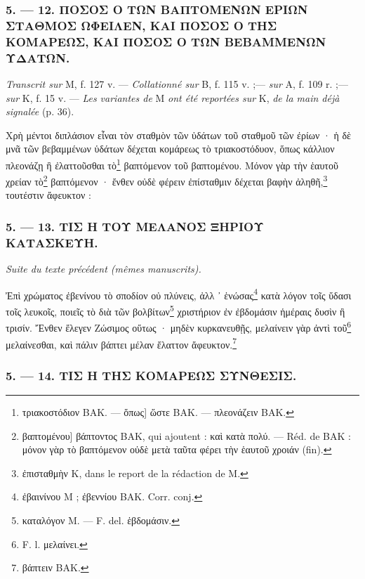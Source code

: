 \documentclass[a4paper, 11pt, oneside, polutonikogreek, french]{article}
\begin{document}
\bigskip
\centerline{\EightStarTaper}
\centerline{\EightStarTaper\EightStarTaper}
\bigskip

\subsubsection{5. --- 12. ΠΟΣΟΣ Ο ΤΩΝ ΒΑΠΤΟΜΕΝΩΝ ΕΡΙΩΝ ΣΤΑΘΜΟΣ ΩΦΕΙΛΕΝ, ΚΑΙ ΠΟΣΟΣ Ο ΤΗΣ ΚΟΜΑΡΕΩΣ, ΚΑΙ ΠΟΣΟΣ Ο ΤΩΝ ΒΕΒΑΜΜΕΝΩΝ ΥΔΑΤΩΝ.}

\emph{Transcrit sur} M, f. 127 v. --- \emph{Collationné sur} B, f. 115 v. ;--- \emph{sur} A, f. 109 r. ;--- \emph{sur} K, f. 15 v. --- \emph{Les variantes de} M \emph{ont été reportées sur} K, \emph{de la main déjà signalée} (p. 36).

\bigskip

Χρὴ μέντοι διπλάσιον εἶναι τὸν σταθμὸν τῶν ὑδάτων τοῦ σταθμοῦ τῶν ἐρίων · ἡ δὲ μνᾶ τῶν βεβαμμένων ὑδάτων δέχεται κομάρεως τὸ τριακοστόδυον, ὅπως κάλλιον πλεονάζῃ ἢ ἐλαττοῦσθαι τὸ\footnote{τριακοστόδιον BAK. --- ὅπως] ὥστε BAK. --- πλεονάζειν BAK.} βαπτόμενον τοῦ βαπτομένου. Μόνον γὰρ τὴν ἑαυτοῦ χρείαν τὸ\footnote{βαπτομένου] βάπτοντος BAK, qui ajoutent : καὶ κατὰ πολύ. --- Réd. de BAK : μόνον γὰρ τὸ βαπτόμενον οὐδὲ μετὰ ταῦτα φέρει τὴν ἑαυτοῦ χροιάν (fin).} βαπτόμενον · ἔνθεν οὐδὲ φέρειν ἐπίσταθμιν δέχεται βαφὴν ἀληθῆ,\footnote{ἐπισταθμὴν K, dans le report de la rédaction de M.} τουτέστιν ἄφευκτον :

\bigskip
\centerline{\EightStarTaper}
\centerline{\EightStarTaper\EightStarTaper}
\bigskip

\subsubsection{5. --- 13. ΤΙΣ Η ΤΟΥ ΜΕΛΑΝΟΣ ΞΗΡΙΟΥ ΚΑΤΑΣΚΕΥΗ.}

\emph{Suite du texte précédent (mêmes manuscrits).}

\bigskip

Ἐπὶ χρώματος ἐβενίνου τὸ σποδίον οὐ πλύνεις, ἀλλ ᾽ ἑνώσας\footnote{ἐβαινίνου M ; ἐβεννίου BAK. Corr. conj.} κατὰ λόγον τοῖς ὕδασι τοῖς λευκοῖς, ποιεῖς τὸ διὰ τῶν βολβίτων\footnote{καταλόγον M. --- F. del. ἑβδομάσιν.} χριστήριον ἐν ἐβδομάσιν ἡμέραις δυσὶν ἢ τρισίν. Ἔνθεν ἔλεγεν Ζώσιμος οὕτως · μηδὲν κυρκανευθῇς, μελαίνειν γὰρ ἀντὶ τοῦ\footnote{F. l. μελαίνει.} μελαίνεσθαι, καὶ πάλιν βάπτει μέλαν ἔλαττον ἄφευκτον.\footnote{βάπτειν BAK.}

\bigskip
\centerline{\EightStarTaper}
\centerline{\EightStarTaper\EightStarTaper}
\bigskip

\subsubsection{5. --- 14. ΤΙΣ Η ΤΗΣ ΚΟΜΑΡΕΩΣ ΣΥΝΘΕΣΙΣ.}
\end{document}
